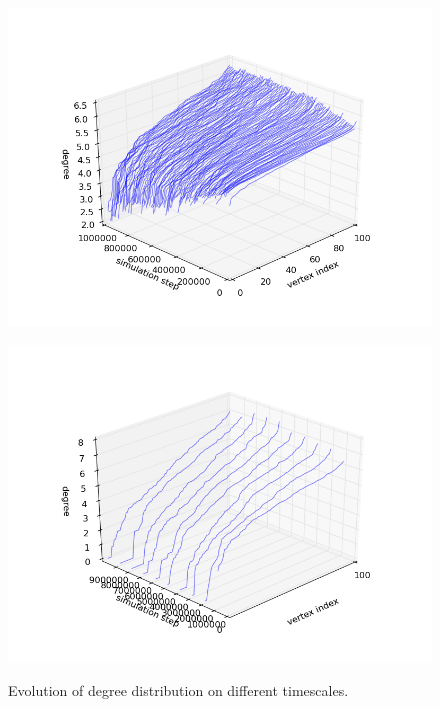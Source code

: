 \documentclass[11pt]{article}
\begin{document}
\begin{figure}[h]
  \begin{minipage}[c][11cm][t]{.9\textwidth}
    \centering
    \includegraphics[width=127mm]{nSquaredTimescale}
    \label{fig:nSquaredTimescale}\par\vfill
  \end{minipage}
  \begin{minipage}[c][11cm][t]{.9\textwidth}
    \centering
    \includegraphics[width=127mm]{nCubedTimescale}
    \label{fig:nCubedTimescale}
  \end{minipage}
  \caption{Evolution of degree distribution on different timescales.}
\end{figure}
\vspace{10cm}
\end{document}

